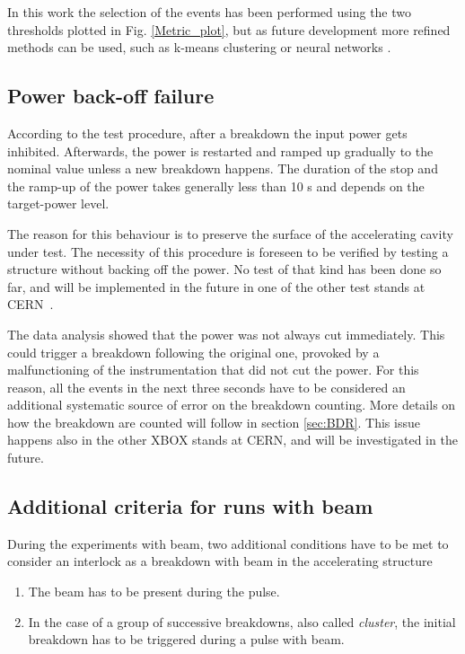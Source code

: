 In this work the selection of the events has been performed using the two thresholds plotted in Fig. \ref{Metric_plot}, but as future development more refined methods can be used, such as k-means clustering or neural networks \cite{ML:book}.



\subsection{Power back-off failure}
\label{sec:pbof}

According to the test procedure, after a breakdown the input power gets inhibited. Afterwards, the power is restarted and ramped up gradually to the nominal value unless a new breakdown happens. The duration of the stop and the ramp-up of the power takes generally less than 10 s and depends on the target-power level.

The reason for this behaviour is to preserve the surface of the accelerating cavity under test. The necessity of this procedure is foreseen to be verified by testing a structure without backing off the power. No test of that kind has been done so far, and will be implemented in the future in one of the other test stands at CERN~\cite{Walter:PC}.

The data analysis showed that the power was not always cut immediately. This could trigger a breakdown  following the original one, provoked by a malfunctioning of the instrumentation that did not cut the power. For this reason, all the events in the next three seconds have to be considered an additional systematic source of error on the breakdown counting. More details on how the breakdown are counted will follow in section \ref{sec:BDR}.  This issue happens also in the other XBOX stands at CERN, and will be investigated in the future. 


\subsection[Additional criteria for runs with beam]{Additional criteria for runs with beam}

During the experiments with beam, two additional conditions have to be met to consider an interlock as a breakdown with beam in the accelerating structure
\begin{enumerate}
\item The beam has to be present during the pulse.
\item In the case of a group of successive breakdowns, also called \textit{cluster}, the initial breakdown has to be triggered during a pulse with beam.
\end{enumerate}





